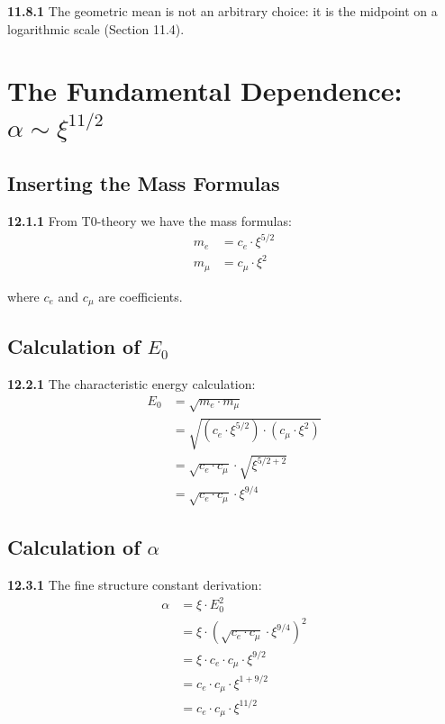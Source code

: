 \noindent \textbf{11.8.1} The geometric mean is not an arbitrary choice: it is the midpoint on a logarithmic scale (Section 11.4).

\section{The Fundamental Dependence: $\alpha \sim \xi^{11/2}$}

\subsection{Inserting the Mass Formulas}

\noindent \textbf{12.1.1} From T0-theory we have the mass formulas:
\begin{align}
	m_e &= c_e \cdot \xi^{5/2} \\
	m_\mu &= c_\mu \cdot \xi^2
\end{align}

where $c_e$ and $c_\mu$ are coefficients.

\subsection{Calculation of $E_0$}

\noindent \textbf{12.2.1} The characteristic energy calculation:
\begin{align}
	E_0 &= \sqrt{m_e \cdot m_\mu} \\
	&= \sqrt{(c_e \cdot \xi^{5/2}) \cdot (c_\mu \cdot \xi^2)} \\
	&= \sqrt{c_e \cdot c_\mu} \cdot \sqrt{\xi^{5/2 + 2}} \\
	&= \sqrt{c_e \cdot c_\mu} \cdot \xi^{9/4}
\end{align}

\subsection{Calculation of $\alpha$}

\noindent \textbf{12.3.1} The fine structure constant derivation:
\begin{align}
	\alpha &= \xi \cdot E_0^2 \\
	&= \xi \cdot (\sqrt{c_e \cdot c_\mu} \cdot \xi^{9/4})^2 \\
	&= \xi \cdot c_e \cdot c_\mu \cdot \xi^{9/2} \\
	&= c_e \cdot c_\mu \cdot \xi^{1 + 9/2} \\
	&= c_e \cdot c_\mu \cdot \xi^{11/2}
\end{align}

